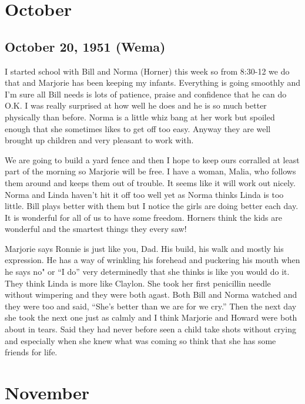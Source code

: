 \documentclass[
]{book}
\begin{document}
\hypertarget{october-1}{%
\section{October}\label{october-1}}

\hypertarget{october-20-1951-wema}{%
\subsection{October 20, 1951 (Wema)}\label{october-20-1951-wema}}

I started school with Bill and Norma (Horner) this week so from 8:30-12 we do that and Marjorie has been keeping my infants. Everything is going smoothly and I'm sure all Bill needs is lots of patience, praise and confidence that he can do O.K. I was really surprised at how well he does and he is so much better physically than before. Norma is a little whiz bang at her work but spoiled enough that she sometimes likes to get off too easy. Anyway they are well brought up children and very pleasant to work with.

We are going to build a yard fence and then I hope to keep ours corralled at least part of the morning so Marjorie will be free. I have a woman, Malia, who follows them around and keeps them out of trouble. It seems like it will work out nicely. Norma and Linda haven't hit it off too well yet as Norma thinks Linda is too little. Bill plays better with them but I notice the girls are doing better each day. It is wonderful for all of us to have some freedom. Horners think the kids are wonderful and the smartest things they every saw!

Marjorie says Ronnie is just like you, Dad. His build, his walk and mostly his expression. He has a way of wrinkling his forehead and puckering his mouth when he says
no" or ``I do'' very determinedly that she thinks is like you would do it. They think Linda is more like Claylon. She took her first penicillin needle without wimpering and they were both agast. Both Bill and Norma watched and they were too and said, ``She's better than we are for we cry.'' Then the next day she took the next one just as calmly and I think Marjorie and Howard were both about in tears. Said they had never before seen a child take shots without crying and especially when she knew what was coming so think that she has some friends for life.

\hypertarget{november-1}{%
\section{November}\label{november-1}}
\end{document}
